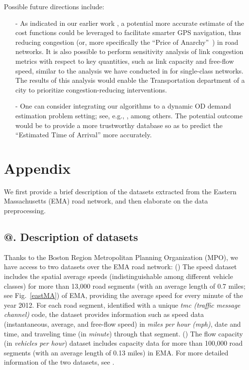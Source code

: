 \documentclass[3p]{elsarticle}
\makeatletter
\newcommand{\rmnum}[1]{\romannumeral #1}
\newcommand{\Rmnum}[1]{\expandafter\@slowromancap\romannumeral #1@}
\makeatother
\begin{document}
Possible future directions include:
\begin{itemize}
\item[-] As indicated in our earlier work \cite{ieee18}, a potential
  more accurate estimate of the cost functions could be leveraged to
  facilitate smarter GPS navigation, thus reducing congestion (or, more
  specifically the ``Price of Anarchy''~\cite{CDC16,IFAC17,ieee18}) in
  road networks. It is also possible to perform sensitivity analysis of
  link congestion metrics with respect to key quantities, such as link
  capacity and free-flow speed, similar to the analysis we have
  conducted in \cite{ieee18} for single-class networks. The results of
  this analysis would enable the Transportation department of a city to
  prioritize congestion-reducing interventions.
 
\item[-] One can consider integrating our algorithms to a dynamic OD
  demand estimation problem setting; see, e.g.,
  \cite{pitombeira2017dynamic}, among others. The potential outcome
  would be to provide a more trustworthy database so as to predict the
  ``Estimated Time of Arrival'' \cite{eta} more accurately.
\end{itemize}

	
\section*{Appendix}   \label{sec:append}

We first provide a brief description of the datasets extracted from the
Eastern Massachusetts (EMA) road network, and then elaborate on the data
preprocessing.

\subsection*{\Rmnum{1}. Description of datasets} \label{sec: dataset}

Thanks to the Boston Region Metropolitan Planning Organization (MPO), we have access to two datasets over the EMA road network: 
\noindent (\rmnum{1}) The speed dataset includes the spatial average
speeds (indistinguishable among different vehicle classes) for more than
13,000 road segments (with an average length of 0.7 miles; see
Fig.~\ref{eastMA}) of EMA, providing the average speed for every minute
of the year 2012.  For each road segment, identified with a unique {\em
  tmc (traffic message channel)} code, the dataset provides information
such as speed data (instantaneous, average, and free-flow speed) in
\emph{miles per hour (mph)}, date and time, and traveling time (in
\emph{minute}) through that segment.
\noindent (\rmnum{2}) The flow capacity (in \emph{vehicles per hour})
dataset includes capacity data for more than 100,000 road segments (with
an average length of 0.13 miles) in EMA. For more detailed information
of the two datasets, see \cite{CDC16}.
\end{document}
